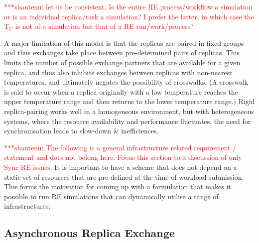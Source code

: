 \documentclass{rspublic}
\newcommand{\jhanote}[1]{ {\textcolor{red} { ***shantenu: #1 }}}
\newcommand{\jhanote}[1]{}
\begin{document}



\jhanote{let us be consistent. Is the entire RE process/workflow a
  simulation or is an individual replica/task a simulation? I prefer
  the latter, in which case the T$_C$ is not of a simulation but that
  of a RE run/work/process?}


A major limitation of this model is that the replicas are paired in
fixed groups and thus exchanges take place between pre-determined
pairs of replicas.  This limits the number of possible exchange
partners that are available for a given replica, and thus also
inhibits exchanges between replicas with non-nearest temperatures, and
ultimately negates the possibility of crosswalks. (A crosswalk is said
to occur when a replica originally with a low temperature reaches the
upper temperature range and then returns to the lower temperature
range.)  Rigid replica-pairing works well in a homogeneous
environment, but with heterogeneous systems, where the resource
availability and performance fluctuates, the need for synchronisation
leads to slow-down \& inefficiences.

\jhanote{The following is a general infrastructure related requirement
  / statement and does not belong here. Focus this section to a
  discussion of only Sync RE issues.} It is important to have a scheme
that does not depend on a static set of resources that are pre-defined
at the time of workload submission.  This forms the motivation for
coming up with a formulation that makes it possible to run RE
simulations that can dynamically utilise a range of infrastructures.

 
\subsection{Asynchronous Replica Exchange}
\end{document}
